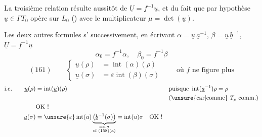La troisième relation résulte aussitôt de $\underline U=f^{-1}\underline u$, et du fait que par hypothèse  $\underline u\in\Gamma T_0$ opère sur $L_0$ () avec le multiplicateur $\mu=\det(\underline u)$.


Les deux autres formules s' successivement, en écrivant $\alpha=\underline u\,\underline a^{-1}$, $\beta=\underline u\,\underline b^{-1}$, $\underline U=f^{-1}\underline u$
\[
\alpha_0=f^{-1}\alpha,\quad\beta_0=f^{-1}\beta
\]
\[
(161)\qquad
\left\{
\begin{aligned}
\underline u(\rho)&=\operatorname{int}(\alpha)(\rho)\\
\underline u(\sigma)&=\varepsilon\operatorname{int}(\beta)(\sigma)
\end{aligned}
\right.
\qquad\text{où }f\text{ ne figure plus}
\]
\[
\begin{aligned}
\text{i.e.}\qquad\underline u(\rho)&=\operatorname{int}(\underline u)(\rho)
&&\text{puisque }\operatorname{int}(\underline a^{-1})\rho=\rho\\
&&&\text{(\unsure{car|comme} }T_\rho\text{ comm.)}\\
&\text{OK !}\\
\underline u(\sigma)&=\unsure{\varepsilon}\operatorname{int}(u)
\underbrace{\bigl(\underline b^{-1}(\sigma)\bigr)}_{\substack{=\varepsilon.\sigma\\\text{cf (158)(a)}}}
=\operatorname{int}(u)\sigma\quad\text{OK !}
\end{aligned}
\]

